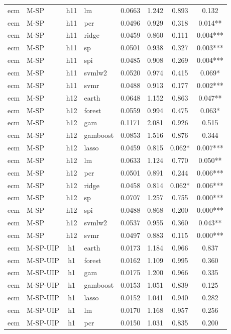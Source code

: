 \begin{ThreePartTable}
\begin{longtable}[t]{llclcccc}
ecm & M-SP & h11 & lm & 0.0663 & 1.242 & 0.893 & 0.132\\
ecm & M-SP & h11 & pcr & 0.0496 & 0.929 & 0.318 & 0.014**\\
ecm & M-SP & h11 & ridge & 0.0459 & 0.860 & 0.111 & 0.004***\\
ecm & M-SP & h11 & sp & 0.0501 & 0.938 & 0.327 & 0.003***\\
ecm & M-SP & h11 & spi & 0.0485 & 0.908 & 0.269 & 0.004***\\
ecm & M-SP & h11 & svmlw2 & 0.0520 & 0.974 & 0.415 & 0.069*\\
ecm & M-SP & h11 & svmr & 0.0488 & 0.913 & 0.177 & 0.002***\\
\addlinespace
ecm & M-SP & h12 & earth & 0.0648 & 1.152 & 0.863 & 0.047**\\
ecm & M-SP & h12 & forest & 0.0559 & 0.994 & 0.475 & 0.063*\\
ecm & M-SP & h12 & gam & 0.1171 & 2.081 & 0.926 & 0.515\\
ecm & M-SP & h12 & gamboost & 0.0853 & 1.516 & 0.876 & 0.344\\
ecm & M-SP & h12 & lasso & 0.0459 & 0.815 & 0.062* & 0.007***\\
ecm & M-SP & h12 & lm & 0.0633 & 1.124 & 0.770 & 0.050**\\
ecm & M-SP & h12 & pcr & 0.0501 & 0.891 & 0.244 & 0.006***\\
ecm & M-SP & h12 & ridge & 0.0458 & 0.814 & 0.062* & 0.006***\\
ecm & M-SP & h12 & sp & 0.0707 & 1.257 & 0.755 & 0.000***\\
ecm & M-SP & h12 & spi & 0.0488 & 0.868 & 0.200 & 0.000***\\
ecm & M-SP & h12 & svmlw2 & 0.0537 & 0.955 & 0.360 & 0.043**\\
ecm & M-SP & h12 & svmr & 0.0497 & 0.883 & 0.115 & 0.000***\\
\addlinespace
ecm & M-SP-UIP & h1 & earth & 0.0173 & 1.184 & 0.966 & 0.837\\
ecm & M-SP-UIP & h1 & forest & 0.0162 & 1.109 & 0.995 & 0.360\\
ecm & M-SP-UIP & h1 & gam & 0.0175 & 1.200 & 0.966 & 0.335\\
ecm & M-SP-UIP & h1 & gamboost & 0.0153 & 1.051 & 0.839 & 0.125\\
ecm & M-SP-UIP & h1 & lasso & 0.0152 & 1.041 & 0.940 & 0.282\\
ecm & M-SP-UIP & h1 & lm & 0.0170 & 1.168 & 0.957 & 0.256\\
ecm & M-SP-UIP & h1 & pcr & 0.0150 & 1.031 & 0.835 & 0.200\\

\end{longtable}
\end{ThreePartTable}
